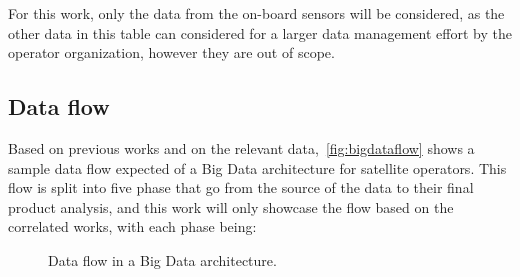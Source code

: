 For this work, only the data from the on-board sensors will be considered, as the other data in this table can considered for a larger data management effort by the operator organization, however they are out of scope.

\subsection{Data flow}\label{ch:corr:dataflow}

Based on previous works and on the relevant data,~\autoref{fig:bigdataflow} shows a sample data flow expected of a Big Data architecture for satellite operators.
This flow is split into five phase that go from the source of the data to their final product analysis, and this work will only showcase the flow based on the correlated works, with each phase being:

\begin{figure}[H]
  \caption{Data flow in a Big Data architecture.}\label{fig:bigdataflow}
  \vspace{6mm}
  \begin{center}
  \end{center}
  \vspace{2mm}
  \legenda{}
\end{figure}

